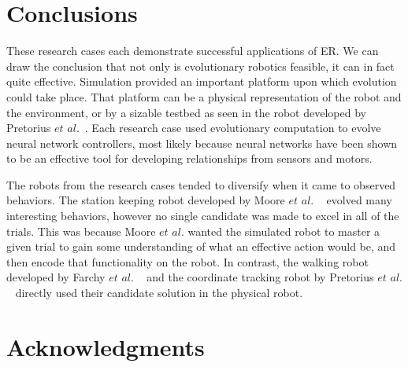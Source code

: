 \documentclass{sig-alternate}
\begin{document}
\section{Conclusions}\label{conclusion}

 These research cases each demonstrate successful applications of ER. We can draw the conclusion that not only is evolutionary robotics feasible, it can in fact quite effective. Simulation provided an important platform upon which evolution could take place. That platform can be a physical representation of the robot and the environment, or by a sizable testbed as seen in the robot developed by Pretorius $et$ $al.$~\cite{Pretorius:2009:TAN:1632149.1632171}. Each research case used evolutionary computation to evolve neural network controllers, most likely because neural networks have been shown to be an effective tool for developing relationships from sensors and motors.

 The robots from the research cases tended to diversify when it came to observed behaviors. The station keeping robot developed by Moore $et$ $al.$ ~\cite{Moore:2013:ESK:2463372.2463402} evolved many interesting behaviors, however no single candidate was made to excel in all of the trials. This was because Moore $et$ $al.$ wanted the simulated robot to master a given trial to gain some understanding of what an effective action would be, and then encode that functionality on the robot. In contrast, the walking robot developed by Farchy $et$ $al.$ ~\cite{Farchy:2013:HRL:2484920.2484930} and the coordinate tracking robot by Pretorius $et$ $al.$ ~\cite{Pretorius:2009:TAN:1632149.1632171} directly used their candidate solution in the physical robot. 


\section{Acknowledgments}


%

%
%
\end{document}
